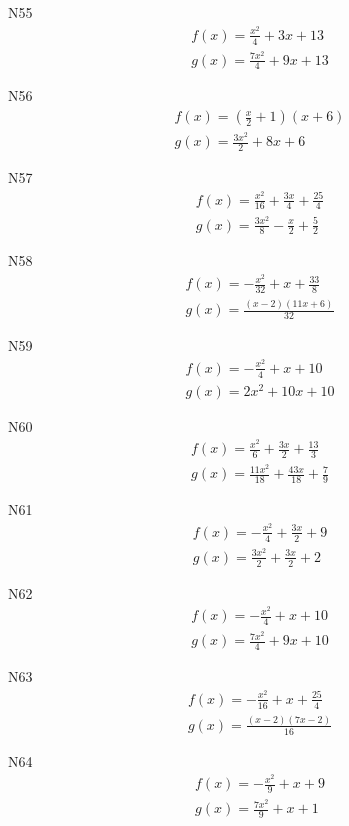 \documentclass[11pt]{report}
\begin{document}
N55
\begin{align*}
 f(x) = \frac{x^{2}}{4} + 3 x + 13\\
 g(x) = \frac{7 x^{2}}{4} + 9 x + 13
\end{align*}

N56
\begin{align*}
 f(x) = \left(\frac{x}{2} + 1\right) \left(x + 6\right)\\
 g(x) = \frac{3 x^{2}}{2} + 8 x + 6
\end{align*}

N57
\begin{align*}
 f(x) = \frac{x^{2}}{16} + \frac{3 x}{4} + \frac{25}{4}\\
 g(x) = \frac{3 x^{2}}{8} - \frac{x}{2} + \frac{5}{2}
\end{align*}

N58
\begin{align*}
 f(x) = - \frac{x^{2}}{32} + x + \frac{33}{8}\\
 g(x) = \frac{\left(x - 2\right) \left(11 x + 6\right)}{32}
\end{align*}

N59
\begin{align*}
 f(x) = - \frac{x^{2}}{4} + x + 10\\
 g(x) = 2 x^{2} + 10 x + 10
\end{align*}

N60
\begin{align*}
 f(x) = \frac{x^{2}}{6} + \frac{3 x}{2} + \frac{13}{3}\\
 g(x) = \frac{11 x^{2}}{18} + \frac{43 x}{18} + \frac{7}{9}
\end{align*}

N61
\begin{align*}
 f(x) = - \frac{x^{2}}{4} + \frac{3 x}{2} + 9\\
 g(x) = \frac{3 x^{2}}{2} + \frac{3 x}{2} + 2
\end{align*}

N62
\begin{align*}
 f(x) = - \frac{x^{2}}{4} + x + 10\\
 g(x) = \frac{7 x^{2}}{4} + 9 x + 10
\end{align*}

N63
\begin{align*}
 f(x) = - \frac{x^{2}}{16} + x + \frac{25}{4}\\
 g(x) = \frac{\left(x - 2\right) \left(7 x - 2\right)}{16}
\end{align*}

N64
\begin{align*}
 f(x) = - \frac{x^{2}}{9} + x + 9\\
 g(x) = \frac{7 x^{2}}{9} + x + 1
\end{align*}
\end{document}
